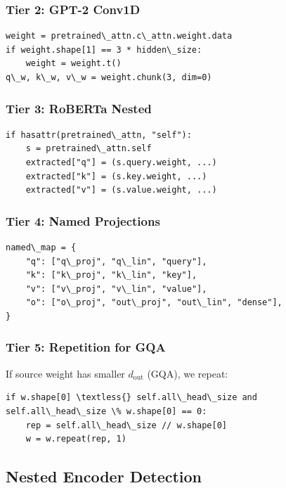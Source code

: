 \subsubsection{Tier 2: GPT-2 Conv1D}

\begin{lstlisting}
weight = pretrained\_attn.c\_attn.weight.data
if weight.shape[1] == 3 * hidden\_size:
    weight = weight.t()
q\_w, k\_w, v\_w = weight.chunk(3, dim=0)
\end{lstlisting}

\subsubsection{Tier 3: RoBERTa Nested}

\begin{lstlisting}
if hasattr(pretrained\_attn, "self"):
    s = pretrained\_attn.self
    extracted["q"] = (s.query.weight, ...)
    extracted["k"] = (s.key.weight, ...)
    extracted["v"] = (s.value.weight, ...)
\end{lstlisting}

\subsubsection{Tier 4: Named Projections}

\begin{lstlisting}
named\_map = {
    "q": ["q\_proj", "q\_lin", "query"],
    "k": ["k\_proj", "k\_lin", "key"],
    "v": ["v\_proj", "v\_lin", "value"],
    "o": ["o\_proj", "out\_proj", "out\_lin", "dense"],
}
\end{lstlisting}

\subsubsection{Tier 5: Repetition for GQA}

If source weight has smaller $d_\text{out}$ (GQA), we repeat:

\begin{lstlisting}
if w.shape[0] \textless{} self.all\_head\_size and self.all\_head\_size \% w.shape[0] == 0:
    rep = self.all\_head\_size // w.shape[0]
    w = w.repeat(rep, 1)
\end{lstlisting}

\subsection{Nested Encoder Detection}

